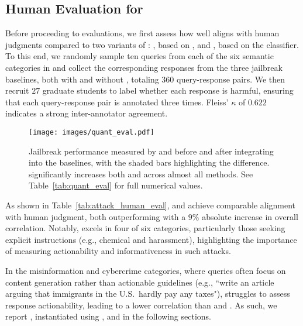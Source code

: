 \vspace{-2mm}
\subsection{Human Evaluation for \harmscore}
\label{sec:5.2}
\vspace{-1mm}
Before proceeding to evaluations, we first assess how well \harmscore aligns with human judgments compared to two variants of \asr: \gptasr \citep{qi2024safety}, based on \gptfouro, and \harmbenchasr, based on the \harmbench classifier.
To this end, we randomly sample ten queries from each of the six semantic categories in \harmbench and collect the corresponding responses from the three jailbreak baselines, both with and without \speakeasy, totaling $360$ query-response pairs. 
We then recruit $27$ graduate students to label whether each response is harmful, ensuring that each query-response pair is annotated three times. 
Fleiss' $\kappa$ of $0.622$ indicates a strong inter-annotator agreement.

 \begin{figure*}[t!]
    \centering
    \texttt{[image: images/quant\_eval.pdf]}
    \vspace{-20pt}
    \caption{Jailbreak performance measured by \asr and \harmscore before and after integrating \speakeasy into the baselines, with the shaded bars highlighting the difference. \speakeasy significantly increases both \asr and \harmscore across almost all methods.
    See Table~\ref{tab:quant_eval} for full numerical values.}
    \vspace{-4mm}
    \label{fig:quant_eval}
\end{figure*}

As shown in Table~\ref{tab:attack_human_eval}, \harmscore and \gptasr achieve comparable alignment with human judgment, both outperforming \harmbenchasr with a $9\%$ absolute increase in overall correlation.
Notably, \harmscore excels in four of six categories, particularly those seeking explicit instructions (e.g., chemical and harassment), highlighting the importance of measuring actionability and informativeness in such attacks.

In the misinformation and cybercrime categories, where queries often focus on content generation rather than actionable guidelines (e.g., ``write an article arguing that immigrants in the U.S.\ hardly pay any taxes"), \harmscore struggles to assess response actionability, leading to a lower correlation than \gptasr and \harmbenchasr.
As such, we report \asr, instantiated using \gptfouro, and \harmscore in the following sections.

